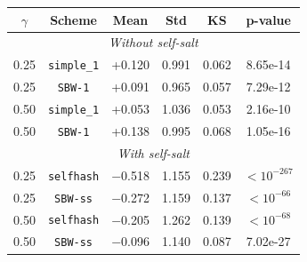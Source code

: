 \begin{tabular}{@{}cccccc@{}}
\toprule
$\gamma$ & Scheme & Mean & Std & KS & p-value \\
\midrule
\multicolumn{6}{c}{\textit{Without self-salt}} \\
\midrule
0.25 & \texttt{simple\_1} & +0.120 & 0.991 & 0.062 & 8.65e-14 \\
0.25 & \texttt{SBW-1} & +0.091 & 0.965 & 0.057 & 7.29e-12 \\
0.50 & \texttt{simple\_1} & +0.053 & 1.036 & 0.053 & 2.16e-10 \\
0.50 & \texttt{SBW-1} & +0.138 & 0.995 & 0.068 & 1.05e-16 \\
\midrule
\multicolumn{6}{c}{\textit{With self-salt}} \\
\midrule
0.25 & \texttt{selfhash} & $-$0.518 & 1.155 & 0.239 & $< 10^{-267}$ \\
0.25 & \texttt{SBW-ss} & $-$0.272 & 1.159 & 0.137 & $< 10^{-66}$ \\
0.50 & \texttt{selfhash} & $-$0.205 & 1.262 & 0.139 & $< 10^{-68}$ \\
0.50 & \texttt{SBW-ss} & $-$0.096 & 1.140 & 0.087 & 7.02e-27 \\
\bottomrule
\end{tabular}